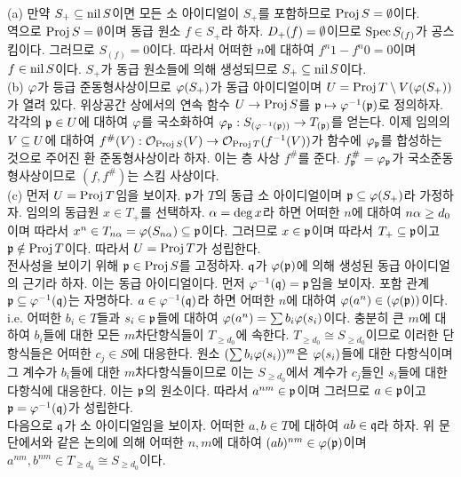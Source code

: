 \begin{enumerate}[label=\tb{2.\arabic*.},itemindent=0mm,itemsep=4mm]
\begin{enumerate}[label=(\alph*)]
	\end{enumerate}
	\sol (a) 만약 $S_+\subseteq\operatorname{nil} S$이면 모든 소 아이디얼이 $S_+$를 포함하므로 $\operatorname{Proj} S=\emptyset$이다.\\
	역으로 $\operatorname{Proj} S=\emptyset$이며 동급 원소 $f\in S_+$라 하자. $D_+(f)=\emptyset$이므로 $\operatorname{Spec} S_{(f)}$가 공스킴이다.
	그러므로 $S_{(f)}=0$이다. 따라서 어떠한 $n$에 대하여 $f^n1-f^n0=0$이며 $f\in\operatorname{nil} S$이다.
	$S_+$가 동급 원소들에 의해 생성되므로 $S_+\subseteq\operatorname{nil} S$이다.\\
	(b) $\varphi$가 등급 준동형사상이므로 $\varphi(S_+)$가 동급 아이디얼이며 $U=\operatorname{Proj} T\setminus V(\varphi(S_+))$가 열려 있다.
	위상공간 상에서의 연속 함수 $U\rightarrow\operatorname{Proj} S$를 $\mathfrak{p}\mapsto\varphi^{-1}(\mathfrak{p})$로 정의하자.
	각각의 $\mathfrak{p}\in U$에 대하여 $\varphi$를 국소화하여 $\varphi_{\mathfrak{p}}:S_{(\varphi^{-1}(\mathfrak{p}))}\rightarrow T_{(\mathfrak{p})}$를 얻는다.
	이제 임의의 $V\subseteq U$에 대하여 $f^\#(V):\mathcal{O}_{\operatorname{Proj} S}(V)\rightarrow\mathcal{O}_{\operatorname{Proj} T}(f^{-1}(V))$가
	함수에 $\varphi_{\mathfrak{p}}$를 합성하는 것으로 주어진 환 준동형사상이라 하자. 이는 층 사상 $f^\#$를 준다.
	$f^\#_{\mathfrak{p}}=\varphi_{\mathfrak{p}}$가 국소준동형사상이므로 $(f,f^\#)$는 스킴 사상이다.\\
	(c) 먼저 $U=\operatorname{Proj} T$임을 보이자. $\mathfrak{p}$가 $T$의 동급 소 아이디얼이며 $\mathfrak{p}\subseteq\varphi(S_+)$라 가정하자.
	임의의 동급원 $x\in T_+$를 선택하자. $\alpha=\deg x$라 하면 어떠한 $n$에 대하여 $n\alpha\ge d_0$이며
	따라서 $x^n\in T_{n\alpha}=\varphi(S_{n\alpha})\subseteq\mathfrak{p}$이다.
	그러므로 $x\in\mathfrak{p}$이며 따라서 $T_+\subseteq\mathfrak{p}$이고 $\mathfrak{p}\notin\operatorname{Proj} T$이다. 따라서 $U=\operatorname{Proj} T$가 성립한다.\\
	전사성을 보이기 위해 $\mathfrak{p}\in\operatorname{Proj} S$를 고정하자. $\mathfrak{q}$가 $\varphi(\mathfrak{p})$에 의해 생성된 동급 아이디얼의 근기라 하자.
	이는 동급 아이디얼이다. 먼저 $\varphi^{-1}(\mathfrak{q})=\mathfrak{p}$임을 보이자. 포함 관계 $\mathfrak{p}\subseteq\varphi^{-1}(\mathfrak{q})$는 자명하다.
	$a\in\varphi^{-1}(\mathfrak{q})$라 하면 어떠한 $n$에 대하여 $\varphi(a^n)\in(\varphi(\mathfrak{p}))$이다.
	i.e. 어떠한 $b_i\in T$들과 $s_i\in\mathfrak{p}$들에 대하여 $\varphi(a^n)=\sum b_i\varphi(s_i)$이다.
	충분히 큰 $m$에 대하여 $b_i$들에 대한 모든 $m$차단항식들이 $T_{\ge d_0}$에 속한다.
	$T_{\ge d_0}\cong S_{\ge d_0}$이므로 이러한 단항식들은 어떠한 $c_j\in S$에 대응한다.
	원소 $(\sum b_i\varphi(s_i))^m$은 $\varphi(s_i)$들에 대한 다항식이며 그 계수가 $b_i$들에 대한 $m$차다항식들이므로
	이는 $S_{\ge d_0}$에서 계수가 $c_j$들인 $s_i$들에 대한 다항식에 대응한다. 이는 $\mathfrak{p}$의 원소이다.
	따라서 $a^{nm}\in\mathfrak{p}$이며 그러므로 $a\in\mathfrak{p}$이고 $\mathfrak{p}=\varphi^{-1}(\mathfrak{q})$가 성립한다.\\
	다음으로 $\mathfrak{q}$가 소 아이디얼임을 보이자. 어떠한 $a,b\in T$에 대하여 $ab\in\mathfrak{q}$라 하자.
	위 문단에서와 같은 논의에 의해 어떠한 $n,m$에 대하여 $(ab)^{nm}\in\varphi(\mathfrak{p})$이며
	$a^{nm},b^{nm}\in T_{\ge d_0}\cong S_{\ge d_0}$이다.

\end{enumerate}
